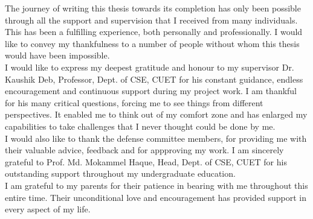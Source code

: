 \begin{acknowledgements}

The journey of writing this thesis towards its completion has only been possible through all the support and supervision that I received from many individuals. This has been a fulfilling experience, both personally and professionally. I would like to convey my thankfulness to a number of people without whom this thesis would have been impossible. \\ I would like to express my deepest gratitude and honour to my supervisor Dr. Kaushik Deb, Professor, Dept. of CSE, CUET for his constant guidance, endless encouragement and continuous support during my project work. I am thankful for his many critical questions, forcing me to see things from different perspectives. It enabled me to think out of my comfort zone and has enlarged my capabilities to take challenges that I never thought could be done by me. \\ I would also like to thank the defense committee members, for providing me with their valuable advice, feedback and for appproving my work. I am sincerely grateful to Prof. Md. Mokammel Haque, Head, Dept. of CSE, CUET for his outstanding support throughout my undergraduate education. \\ I am grateful to my parents for their patience in bearing with me throughout this entire time. Their unconditional love and encouragement has provided support in every aspect of my life.

\end{acknowledgements}